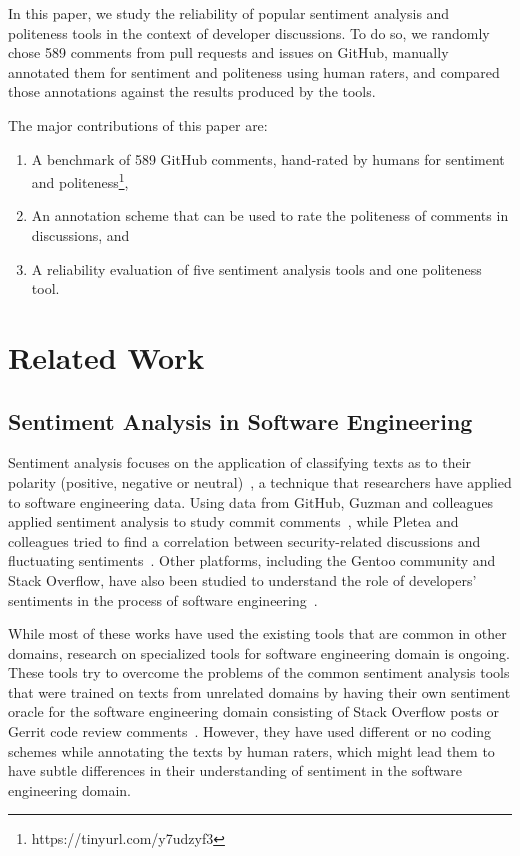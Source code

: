 In this paper, we study the reliability of popular sentiment analysis 
and politeness tools in the context of developer discussions.
To do so, we randomly chose 589 comments from pull requests and issues on GitHub,
manually annotated them for sentiment and politeness using human raters,
and compared those annotations against the results produced by the tools. 
 


The major contributions of this paper are:
\begin{enumerate}
    \item A benchmark of 589 GitHub comments, 
    hand-rated by humans for sentiment and politeness\footnote{https://tinyurl.com/y7udzyf3}, 
    \item An annotation scheme that can be used to rate 
    the politeness of comments in discussions, and
    \item A reliability evaluation of five sentiment analysis 
    tools and one politeness tool.
\end{enumerate}




\section{Related Work}\label{relwork}
\subsection{Sentiment Analysis in Software Engineering}\label{rwsent}

Sentiment analysis focuses on the application of classifying texts as to their polarity (positive, negative or neutral)~\cite{pang2008opinion}, a technique that researchers have applied to software engineering data. Using data from GitHub, Guzman and colleagues applied sentiment analysis to study commit comments~\cite{guzman2014sentiment}, while Pletea and colleagues tried to find a correlation between security-related discussions and fluctuating sentiments~\cite{pletea2014security}. Other platforms, including the Gentoo community and Stack Overflow, have also been studied to understand the role of developers' sentiments in the process of software engineering~\cite{garcia2013role,islam2016towards,guzman2013towards,novielli2014towards}.

While most of these works have used the existing tools that are common in other domains, research on specialized tools for software engineering domain is ongoing. These tools try to overcome the problems of the common sentiment analysis tools that were trained on texts from unrelated domains by having their own sentiment oracle for the software engineering domain consisting of Stack Overflow posts or Gerrit code review comments~\cite{ahmed2017senticr,calefato2017sentiment}. However, they have used different or no coding schemes while annotating the texts by human raters, which might lead them to have subtle differences in their understanding of sentiment in the software engineering domain.

